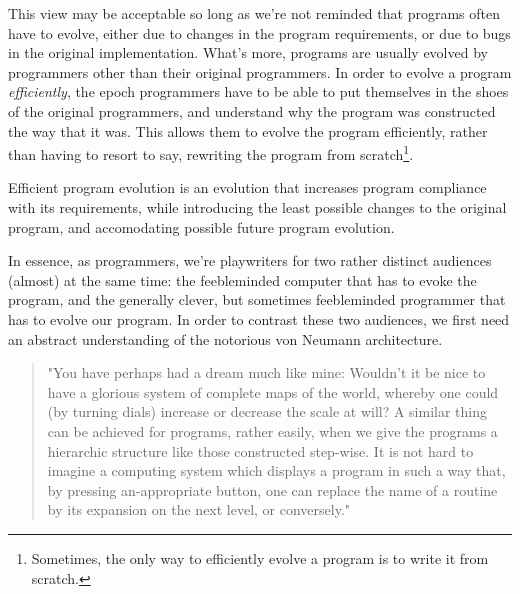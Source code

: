 This view may be acceptable so long as we're not reminded that programs often
have to evolve, either due to changes in the program requirements, or due to
bugs in the original implementation. What's more, programs are usually evolved
by programmers other than their original programmers. In order to evolve a
program \emph{efficiently}, the epoch programmers have to be able to put
themselves in the shoes of the original programmers, and understand why the
program was constructed the way that it was.  This allows them to evolve the
program efficiently, rather than having to resort to say, rewriting the program
from scratch\footnote{Sometimes, the only way to efficiently evolve a program
is to write it from scratch.}.

\begin{definition}

Efficient program evolution is an evolution that increases program compliance
with its requirements, while introducing the least possible changes to the
original program, and accomodating possible future program  evolution.

\end{definition}

In essence, as programmers, we're playwriters for two rather distinct audiences
(almost) at the same time: the feebleminded computer that has to evoke the
program, and the generally clever, but sometimes feebleminded programmer that
has to evolve our program. In order to contrast these two audiences, we first
need an abstract understanding of the notorious von Neumann architecture.







\begin{quote}"You have perhaps had a dream much like mine: Wouldn't it be nice
to have a glorious system of complete maps of the world, whereby one could (by
turning dials) increase or decrease the scale at will? A similar thing can be
achieved for programs, rather easily, when we give the programs a hierarchic
structure like those constructed step-wise. It is not hard to imagine a
computing system which displays a program in such a way that, by pressing
an-appropriate button, one can replace the name of a routine by its expansion
on the next level, or conversely."\cite{knuth-review-of-sp}\end{quote}

